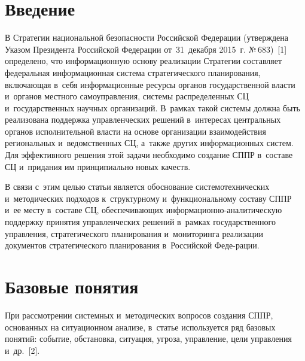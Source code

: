 


\thispagestyle{headings}

\begin{multicols}{2}

\label{st\stat}

\section{Введение}

     В Стратегии национальной безопасности Российской Федерации 
(утверждена Указом Президента Российской Федерации от~31~декабря 
2015~г. №\,683)~[1] определено, что информационную основу реализации 
Стратегии составляет федеральная информационная сис\-те\-ма стратегического 
планирования, включающая в~себя информационные ресурсы органов 
государственной власти и~органов местного самоуправления, сис\-те\-мы 
распределенных СЦ и~государственных научных 
организаций. В~рамках такой сис\-те\-мы должна быть реализована поддержка 
управленческих решений в~интересах центральных органов исполнительной 
власти на основе организации взаимодействия региональных 
и~ведомственных СЦ, а~также других информационных 
сис\-тем. Для эффективного решения этой задачи необходимо создание СППР 
в~со\-ста\-ве СЦ и~придания им принципиально новых качеств. 
     
     В связи с~этим целью статьи является обоснование сис\-те\-мо\-тех\-ни\-че\-ских 
и~методических подхо\-дов к~структурному и~функциональному составу\linebreak 
СППР и~ее месту в~составе СЦ, обеспечивающих 
информационно-аналитическую поддержку принятия управленческих 
решений в~рамках государственного управления, стратегического 
планирования и~мониторинга реализации документов стратегического 
планирования в~Российской Феде-\linebreak рации. 

\vspace*{-6pt}
     
\section{Базовые понятия }

\vspace*{-2pt}

    При рассмотрении сис\-тем\-ных и~методических вопросов создания СППР, 
основанных на ситуационном анализе, в~статье используется ряд базовых 
понятий: событие, обстановка, ситуация, угроза, управление, цели 
управления и~др.~[2]. 
    

\end{multicols}
